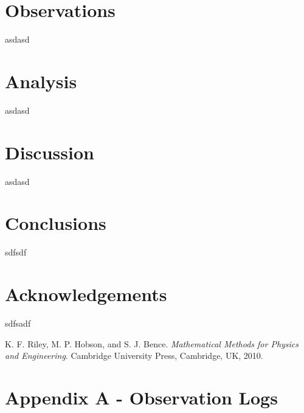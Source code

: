 \documentclass[twocolumn]{revtex4}
\begin{document}
\vspace{-3ex}
\section{Observations} 
\vspace{-2ex}

asdasd

\vspace{-3ex}
\section{Analysis}
\vspace{-2ex}

asdasd

\vspace{-3ex}
\section{Discussion}
\vspace{-2ex}

asdasd

\vspace{-5ex}
\section{Conclusions}
\vspace{-2ex}

sdfsdf

\vspace{-5ex}
\section{Acknowledgements}
\vspace{-2ex}

sdfsadf

\begin{thebibliography}{5}
	K. F. Riley, M. P. Hobson, and S. J. Bence.
	\textit{Mathematical Methods for Physics and Engineering}.
	Cambridge University Press, Cambridge, UK, 2010.	
\end{thebibliography}
\clearpage

\vfill
\twocolumngrid
\vspace{-3ex}
\section*{Appendix A - Observation Logs}
\vspace{-2ex}



\clearpage
\end{document}
